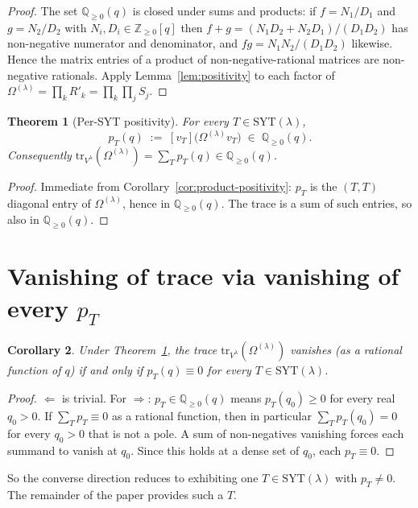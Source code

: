 \documentclass[11pt]{article}
\newtheorem{theorem}{Theorem}
\newtheorem{corollary}[theorem]{Corollary}
\theoremstyle{definition}
\newcommand{\Vlam}{V^{\lambda}}
\newcommand{\Om}{\Omega}
\newcommand{\Rp}{{R'}}
\newcommand{\SYT}{\mathrm{SYT}}
\newcommand{\tr}{\mathrm{tr}}
\begin{document}
\begin{proof}
The set $\mathbb{Q}_{\ge 0}(q)$ is closed under sums and products: if
$f = N_1/D_1$ and $g = N_2/D_2$ with $N_i, D_i \in \mathbb{Z}_{\ge 0}[q]$
then $f + g = (N_1 D_2 + N_2 D_1)/(D_1 D_2)$ has non-negative numerator
and denominator, and $fg = N_1 N_2/(D_1 D_2)$ likewise.  Hence the
matrix entries of a product of non-negative-rational matrices are
non-negative rationals.  Apply Lemma~\ref{lem:positivity} to each
factor of $\Om^{(\lambda)} = \prod_k \Rp_k = \prod_k \prod_j S_j$.
\end{proof}

\begin{theorem}[Per-SYT positivity]\label{thm:per-syt}
For every $T \in \SYT(\lambda)$,
\[
   p_T(q) \;:=\; [v_T]\bigl(\Om^{(\lambda)} v_T\bigr)
   \;\in\; \mathbb{Q}_{\ge 0}(q).
\]
Consequently $\tr_{\Vlam}(\Om^{(\lambda)}) = \sum_{T} p_T(q) \in
\mathbb{Q}_{\ge 0}(q)$.
\end{theorem}

\begin{proof}
Immediate from Corollary~\ref{cor:product-positivity}: $p_T$ is the
$(T,T)$ diagonal entry of $\Om^{(\lambda)}$, hence in
$\mathbb{Q}_{\ge 0}(q)$.  The trace is a sum of such entries, so also in
$\mathbb{Q}_{\ge 0}(q)$.
\end{proof}

\section{Vanishing of trace via vanishing of every $p_T$}\label{sec:reduction}

\begin{corollary}\label{cor:trace-iff-each}
Under Theorem~\ref{thm:per-syt}, the trace
$\tr_{\Vlam}(\Om^{(\lambda)})$ vanishes (as a rational function of $q$)
if and only if $p_T(q) \equiv 0$ for every $T \in \SYT(\lambda)$.
\end{corollary}

\begin{proof}
$\Leftarrow$ is trivial.  For $\Rightarrow$: $p_T \in \mathbb{Q}_{\ge 0}(q)$
means $p_T(q_0) \ge 0$ for every real $q_0 > 0$.  If
$\sum_T p_T \equiv 0$ as a rational function, then in particular
$\sum_T p_T(q_0) = 0$ for every $q_0 > 0$ that is not a pole.  A sum of
non-negatives vanishing forces each summand to vanish at $q_0$.  Since
this holds at a dense set of $q_0$, each $p_T \equiv 0$.
\end{proof}

So the converse direction reduces to exhibiting one $T \in \SYT(\lambda)$
with $p_T \ne 0$.  The remainder of the paper provides such a $T$.
\end{document}
